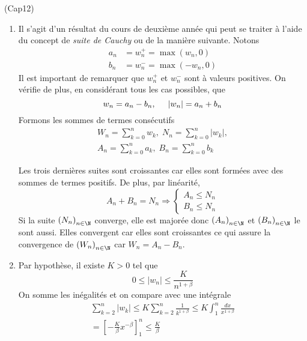 \begin{tiny}(Cap12)\end{tiny}
\begin{enumerate}
 \item Il s'agit d'un résultat du cours de deuxième année qui peut se traiter à l'aide du concept de \emph{suite de Cauchy} ou de la manière suivante.\newline
Notons 
\begin{align*}
a_n &=w_n^+=\max(w_n,0) \\ b_n &=w_n^-=\max(-w_n,0) 
\end{align*}
Il est important de remarquer que $w_n^+$ et $w_n^-$ sont à valeurs positives. On vérifie de plus, en considérant tous les cas possibles, que 
\begin{displaymath}
 w_n = a_n - b_n,\hspace{0.5cm} |w_n| = a_n + b_n
\end{displaymath}
Formons les sommes de termes consécutifs
\begin{multline*}
 W_n = \sum_{k=0}^nw_k, \; N_n = \sum_{k=0}^n|w_k|, \\ A_n = \sum_{k=0}^na_k, \;B_n = \sum_{k=0}^nb_k
\end{multline*}

Les trois dernières suites sont croissantes car elles sont formées avec des sommes de termes positifs. De plus, par linéarité,
\begin{displaymath}
 A_n + B_n = N_n \Rightarrow \left\lbrace 
\begin{aligned}
 A_n \leq N_n \\ B_n\leq N_n
\end{aligned}
\right. 
\end{displaymath}
Si la suite $\left( N_n\right) _{n\in \N}$ converge, elle est majorée donc $\left( A_n\right) _{n\in \N}$ et $\left( B_n\right) _{n\in \N}$ le sont aussi. Elles convergent car elles sont croissantes ce qui assure la convergence de $\left( W_n\right) _{n\in \N}$ car $W_n =A_n - B_n$.
 \item Par hypothèse, il existe $K>0$ tel que 
\begin{displaymath}
 0\leq |w_n| \leq \frac{K}{n^{1+\beta}}
\end{displaymath}
On somme les inégalités et on compare avec une intégrale
\begin{multline*}
 \sum_{k=2}^n|w_k|\leq K \sum_{k=2}^n\frac{1}{k^{1+\beta}}\leq K\int_{1}^{n}\frac{dx}{x^{1+\beta}} \\
= \left[-\frac{K}{\beta}x^{-\beta} \right]_{1}^{n} \leq  \frac{K}{\beta}
\end{multline*}


\end{enumerate}
